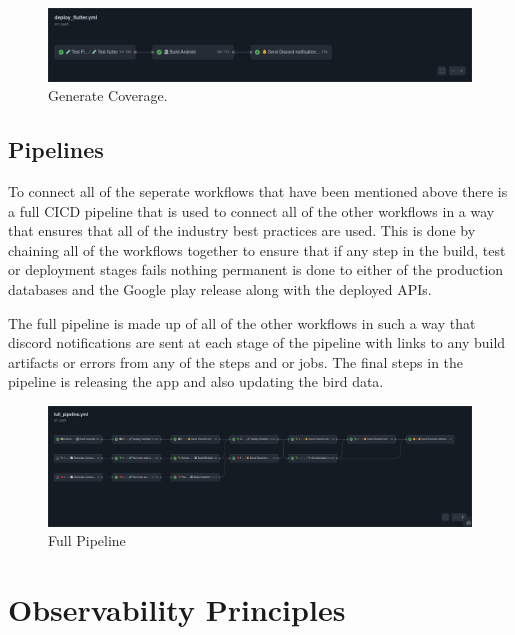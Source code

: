 \documentclass[a4paper]{article}
\begin{document}
\begin{figure}[h]
  \includegraphics[width=\linewidth]{../Assets/andoird.png}
  \caption{Generate Coverage.}
  \label{fig:load graphs}
\end{figure}

\subsection{Pipelines}

To connect all of the seperate workflows that have been mentioned above there 
is a full CICD pipeline that is used to connect all of the other workflows 
in a way that ensures that all of the industry best practices are used. This
is done by chaining all of the workflows together to ensure that if any step 
in the build, test or deployment stages fails nothing permanent is 
done to either of the production databases and the Google play release along with the 
deployed APIs. 
\newline \newline 

The full pipeline is made up of all of the other workflows in such a way that discord notifications 
are sent at each stage of the pipeline with links to any build artifacts or errors from any of 
the steps and or jobs. The final steps in the pipeline is releasing the app and also updating the 
bird data.

\begin{figure}[h]
  \includegraphics[width=\linewidth]{../Assets/full.png}
  \caption{Full Pipeline}
  \label{fig:load graphs}
\end{figure}

\newpage
\section{Observability Principles}
\end{document}
